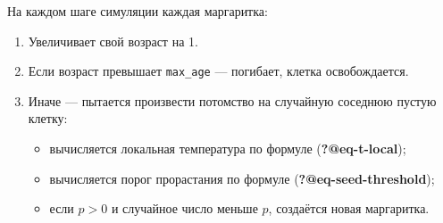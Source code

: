 \documentclass[
  12pt,
  a4paper,
  DIV=11,
  numbers=noendperiod]{scrreprt}
\providecommand{\tightlist}{%
  \setlength{\itemsep}{0pt}\setlength{\parskip}{0pt}}\usepackage{longtable,booktabs,array}
\begin{document}
На каждом шаге симуляции каждая маргаритка:

\begin{enumerate}
\def\labelenumi{\arabic{enumi}.}
\tightlist
\item
  Увеличивает свой возраст на 1.
\item
  Если возраст превышает \texttt{max\_age} --- погибает, клетка
  освобождается.
\item
  Иначе --- пытается произвести потомство на случайную соседнюю пустую
  клетку:

  \begin{itemize}
  \tightlist
  \item
    вычисляется локальная температура по формуле
    (\textbf{?@eq-t-local});
  \item
    вычисляется порог прорастания по формуле
    (\textbf{?@eq-seed-threshold});
  \item
    если \(p > 0\) и случайное число меньше \(p\), создаётся новая
    маргаритка.
  \end{itemize}
\end{enumerate}
\end{document}

